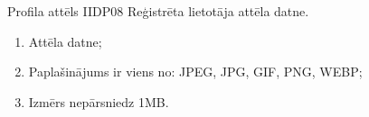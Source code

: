 {Profila attēls}
{IIDP08}
{
	Reģistrēta lietotāja attēla datne.
}
{
	\begin{enumerate}
		\item Attēla datne;
		\item Paplašinājums ir viens no: JPEG, JPG, GIF, PNG, WEBP;
		\item Izmērs nepārsniedz 1MB.
	\end{enumerate}
}
{
}

